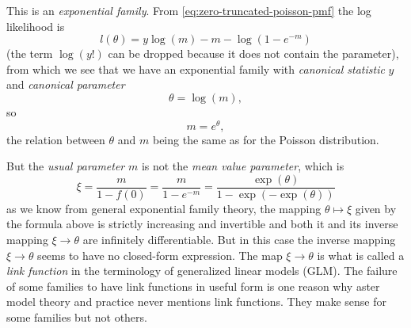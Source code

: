 This is an \emph{exponential family}.
From \eqref{eq:zero-truncated-poisson-pmf} the log likelihood is
$$
   l(\theta) = y \log(m) - m - \log(1 - e^{- m})
$$
(the term $\log(y !)$ can be dropped because it does not contain the
parameter), from which we see that we have an exponential family with
\emph{canonical statistic} $y$ and \emph{canonical parameter}
$$
   \theta = \log(m),
$$
so
$$
   m = e^{\theta},
$$
the relation between $\theta$ and $m$ being the same as for the Poisson
distribution.

But the \emph{usual parameter} $m$ is not the \emph{mean value parameter},
which is
\begin{equation} \label{eq:zero-truncated-poisson-theta-to-xi}
   \xi = \frac{m}{1 - f(0)} = \frac{m}{1 - e^{- m}}
   = \frac{\exp(\theta)}{1 - \exp(- \exp(\theta))}
\end{equation}
as we know from general exponential family theory,
the mapping $\theta \mapsto \xi$ given by the formula above is
strictly increasing and invertible and both it and its inverse mapping
$\xi \to \theta$ are infinitely differentiable.  But in this case
the inverse mapping $\xi \to \theta$ seems to have no closed-form expression.
The map $\xi \to \theta$ is what is called a \emph{link function} in the
terminology of generalized linear models (GLM).  The failure of some
families to have link functions in useful form is one reason why aster
model theory and practice never mentions link functions.  They make
sense for some families but not others.

